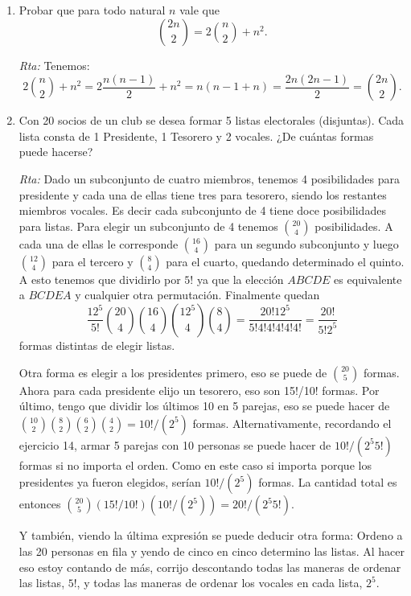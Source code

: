 \documentclass[12pt,spanish,makeidx]{amsbook}
\begin{document}
\begin{enumerate}
\medskip

\item Probar que para todo natural $n$ vale que 
\begin{equation*}
\binom{2n}{2} = 2 \binom{n}{2} + n^2.
\end{equation*}

\noindent\textit{Rta:} Tenemos: $$2\binom{n}{2}+n^2=2\frac{n(n-1)}{2}+n^2={n(n-1+n)}=\frac{2n(2n-1)}{2}=\binom{2n}{2}.$$

\medskip

\item Con 20 socios de un club se desea formar 5 listas electorales (disjuntas). Cada lista
consta de 1 Presidente, 1 Tesorero y 2 vocales. ¿De cuántas formas puede hacerse?

\noindent\textit{Rta:} Dado un subconjunto de cuatro miembros, tenemos 4 posibilidades para presidente y cada una de ellas tiene tres para tesorero, siendo los restantes miembros vocales. Es decir cada subconjunto de 4 tiene doce posibilidades para listas. Para elegir un subconjunto de 4 tenemos $\binom{20}{4}$ posibilidades. A cada una de ellas le corresponde $\binom{16}{4}$ para un segundo subconjunto y luego $\binom{12}{4}$ para el tercero y $\binom{8}{4}$ para el cuarto, quedando determinado el quinto. A esto tenemos que dividirlo por $5!$ ya que la elección $ABCDE$ es equivalente a  $BCDEA$ y cualquier otra permutación. 
Finalmente quedan $$\frac{12^5}{5!}\binom{20}{4}\binom{16}{4}\binom{12^5}{4}\binom{8}{4}=\frac{20!12^5}{5!4!4!4!4!4!}=\frac{20!}{5!2^5}$$ formas distintas de elegir listas.

Otra forma es elegir a los presidentes primero, eso se puede de $\binom{20}{5}$ formas. Ahora para cada presidente elijo un tesorero, eso son 15!/10! formas. Por último, tengo que dividir los últimos 10 en 5 parejas, eso se puede hacer de ${10 \choose 2} {8 \choose 2} {6 \choose 2} {4 \choose 2} = 10! / ( 2^5)$ formas. Alternativamente, recordando el ejercicio 14, armar 5 parejas con 10 personas se puede hacer de $10! / ( 2^5 5!)$ formas si no importa el orden. Como en este caso si importa porque los presidentes ya fueron elegidos, serían $10! / ( 2^5)$ formas. La cantidad total es entonces $\binom{20}{5} (15! / 10!) ( 10! / ( 2^5) ) = 20! / (2^5 5!)$.

Y también, viendo la última expresión se puede deducir otra forma: Ordeno a las 20 personas en fila y yendo de cinco en cinco determino las listas. Al hacer eso estoy contando de más, corrijo descontando todas las maneras de ordenar las listas, $5!$, y todas las maneras de ordenar los vocales en cada lista, $2^5$.


\end{enumerate}
\end{document}
